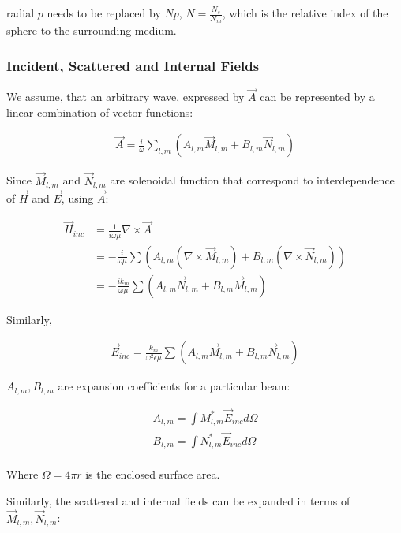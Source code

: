         radial $p$ needs to be replaced by $Np$, $N = \frac{N_s}{N_m}$, which is the relative index of the sphere to the surrounding
        medium.


    \subsubsection{Incident, Scattered and Internal Fields}
        We assume, that an arbitrary wave, expressed by $\vec{A}$ can be represented by a linear combination of vector functions:

        \begin{align}
            \vec{A} = \frac{i}{\omega}\sum_{l,m}\left(A_{l,m}\vec{M}_{l,m}+B_{l,m}\vec{N}_{l,m}\right)
        \end{align}

        Since $\vec{M}_{l,m}$ and $\vec{N}_{l,m}$ are solenoidal function that correspond to interdependence of $\vec{H}$ and $\vec{E}$, using $\vec{A}$:

        \begin{align}
            \vec{H}_{inc} &= \frac{1}{i\omega \mu}\nabla \times \vec{A} \\
            &= - \frac{i}{\omega\mu}\sum\left(A_{l,m}(\nabla\times\vec{M}_{l,m}) + B_{l,m}(\nabla\times\vec{N}_{l,m})\right) \\
            &= - \frac{ik_m}{\omega\mu}\sum\left(A_{l,m}\vec{N}_{l,m}+B_{l,m}\vec{M}_{l,m}\right)
        \end{align}

        Similarly,

        \begin{align}
            \vec{E}_{inc} = \frac{k_m}{\omega^2\epsilon\mu}\sum\left(A_{l,m}\vec{M}_{l,m} + B_{l,m}\vec{N}_{l,m}\right)
        \end{align}

        $A_{l,m}, B_{l,m}$ are expansion coefficients for a particular beam:

        \begin{align}
            A_{l,m} = \int M^*_{l,m}\vec{E}_{inc}d\Omega \\
            B_{l,m} = \int N^*_{l,m}\vec{E}_{inc}d\Omega \\
        \end{align}

        Where $\Omega = 4\pi r$ is the enclosed surface area.

        Similarly, the scattered and internal fields can be expanded in terms of $\vec{M}_{l,m}, \vec{N}_{l,m}$:

